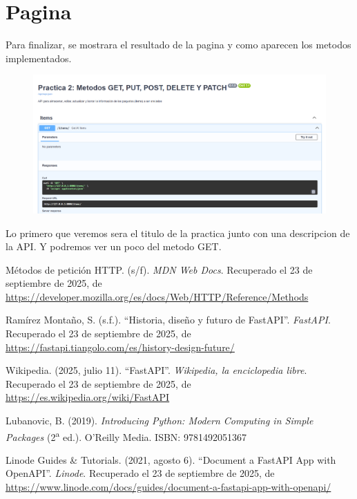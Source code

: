 \documentclass[12pt]{article}
\begin{document}
\section{Pagina}
Para finalizar, se mostrara el resultado de la pagina y como aparecen los metodos implementados.

\begin{figure}[H]
    \centering
    \includegraphics[width=1\textwidth]{Imagenes/Inicio pagina.png}
\end{figure}
Lo primero que veremos sera el titulo de la practica junto con una descripcion de la API.
Y podremos ver un poco del metodo GET.



\begin{thebibliography}{99}

 M\'etodos de petici\'on HTTP. (s/f). \textit{MDN Web Docs}. Recuperado el 23 de septiembre de 2025, de \url{https://developer.mozilla.org/es/docs/Web/HTTP/Reference/Methods}

 Ram\'irez Monta\~no, S. (s.f.). ``Historia, dise\~no y futuro de FastAPI''. \textit{FastAPI}. Recuperado el 23 de septiembre de 2025, de \url{https://fastapi.tiangolo.com/es/history-design-future/}

 Wikipedia. (2025, julio 11). ``FastAPI''. \textit{Wikipedia, la enciclopedia libre}. Recuperado el 23 de septiembre de 2025, de \url{https://es.wikipedia.org/wiki/FastAPI}

 Lubanovic, B. (2019). \textit{Introducing Python: Modern Computing in Simple Packages} (2\textsuperscript{a} ed.). O'Reilly Media. ISBN: 9781492051367

 Linode Guides \& Tutorials. (2021, agosto 6). ``Document a FastAPI App with OpenAPI''. \textit{Linode}. Recuperado el 23 de septiembre de 2025, de \url{https://www.linode.com/docs/guides/document-a-fastapi-app-with-openapi/}

\end{thebibliography}
\end{document}
